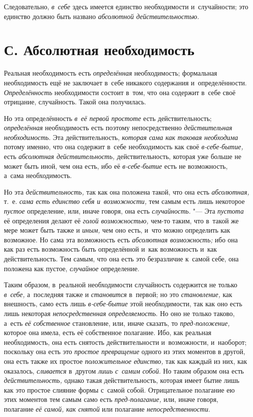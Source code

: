 Следовательно, {\em в~себе} здесь имеется единство
необходимости и~случайности; это единство должно быть названо
{\em абсолютной действительностью}.

\section[С. Абсолютная необходимость]{С. Абсолютная необходимость}

Реальная необходимость есть {\em определённая} необходимость; формальная
необходимость ещё не заключает в~себе никакого содержания и~определённости.
{\em Определённость} необходимости состоит в~том, что
она содержит в~себе своё отрицание, случайность. Такой она получилась.

Но эта определённость {\em в~её первой простоте} есть
действительность; {\em определённая} необходимость есть
поэтому непосредственно {\em действительная
необходимость}. Эта действительность, {\em которая сама
как таковая необходима} потому именно, что она содержит в~себе
необходимость как своё {\em в-себе-бытие,} есть
{\em абсолютная действительность,} действительность,
которая уже больше не может быть иной, чем она есть, ибо её
{\em в-себе-бытие} есть не возможность, а~сама необходимость.

Но эта {\em действительность,} так как она положена
такой, что она есть {\em абсолютная,} т.~е.
{\em сама есть единство себя и~возможности,} тем самым
есть лишь некоторое {\em пустое} определение, или,
иначе говоря, она есть {\em случайность}. "--- Эта
{\em пустота} её определения делают её
{\em голой возможностью,} чем-то таким, что в~такой же
мере может быть также и {\em иным,} чем оно есть, и~что
можно определить как возможное. Но сама эта возможность есть
{\em абсолютная возможность;} ибо она как раз есть
возможность быть определённой и~как возможность и~как действительность. Тем
самым, что она есть это безразличие к~самой себе, она положена как пустое,
{\em случайное} определение.

Таким образом, в~реальной необходимости случайность содержится не только
{\em в~себе,} а~последняя также и {\em становится} в~первой; но это
{\em становление,} как внешность, само есть лишь
{\em в-себе-бытие} этой необходимости, так как оно есть
лишь некоторая {\em непосредственная определяемость}.
Но оно не только таково, а~есть {\em её собственное}
становление, или, иначе сказать, то
{\em пред-положение,} которое она имела, есть её
собственное полагание. Ибо, как реальная необходимость, она есть снятость
действительности и~возможности, и~наоборот; поскольку она есть это
{\em простое превращение} одного из этих моментов в
другой, она есть также их простое {\em положительное
единство,} так как каждый из них, как оказалось,
{\em сливается} в~другом {\em лишь
с~самим собой}. Но таким образом она есть
{\em действительность,} однако такая действительность,
которая имеет бытие лишь как это простое слияние формы с~самой собой.
Отрицательное полагание ею этих моментов тем самым само есть
{\em пред-полагание,} или, иначе говоря, полагание
{\em её самой, как снятой}
или полагание {\em непосредственности}.

